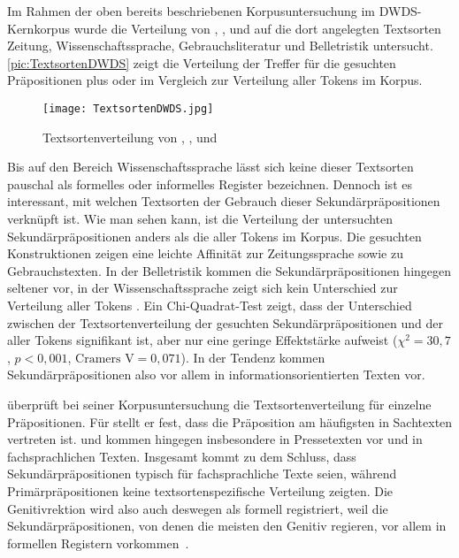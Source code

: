 Im Rahmen der oben bereits beschriebenen Korpusuntersuchung im DWDS-Kernkorpus \citep[s.][]{Vieregge.2019} wurde die Verteilung von \waehrend, \dank,  und  auf die dort angelegten Textsorten \glqq Zeitung\grqq, \glqq Wissenschaftssprache\grqq, \glqq Gebrauchsliteratur\grqq{} und \glqq Belletristik\grqq{} untersucht. 
\autoref{pic:TextsortenDWDS} zeigt die Verteilung der Treffer für die gesuchten Präpositionen plus  oder  im Vergleich zur Verteilung aller Tokens im Korpus.

\begin{figure}
\centering
\texttt{[image: TextsortenDWDS.jpg]}
\caption{Textsortenverteilung von \waehrend, \dank,  und  \citep[s.][]{Vieregge.2019}}
\label{pic:TextsortenDWDS}
\end{figure}

Bis auf den Bereich Wissenschaftssprache lässt sich keine dieser Textsorten pauschal als formelles oder informelles Register bezeichnen. 
Dennoch ist es interessant, mit welchen Textsorten der Gebrauch dieser Sekundärpräpositionen verknüpft ist. 
Wie man sehen kann, ist die Verteilung der untersuchten Sekundärpräpositionen anders als die aller Tokens im Korpus. 
Die gesuchten Konstruktionen zeigen eine leichte Affinität zur Zeitungssprache sowie zu Gebrauchstexten. 
In der Belletristik kommen die Sekundärpräpositionen hingegen seltener vor, in der Wissenschaftssprache zeigt sich kein Unterschied zur Verteilung aller Tokens \citep[s.][]{Vieregge.2019}. 
Ein Chi-Quadrat-Test zeigt, dass der Unterschied zwischen der Textsortenverteilung der gesuchten Sekundärpräpositionen und der aller Tokens signifikant ist, aber nur eine geringe Effektstärke aufweist ($\chi^2=30{,}7$, $p<0{,}001$, $\text{Cramers V}=0{,}071$).
In der Tendenz kommen Sekundärpräpositionen also vor allem in informationsorientierten Texten vor.

\citet[176--184]{DiMeola2000} überprüft bei seiner Korpusuntersuchung die Textsortenverteilung für einzelne Präpositionen. 
Für \waehrend{} stellt er fest, dass die Präposition am häufigsten in Sachtexten vertreten ist.
 und \dank{} kommen hingegen insbesondere in Pressetexten vor und \gegenueber{} in fachsprachlichen Texten. 
Insgesamt kommt \citet[184]{DiMeola2000} zu dem Schluss, dass Sekundärpräpositionen typisch für fachsprachliche Texte seien, während Primärpräpositionen keine textsortenspezifische Verteilung zeigten. 
Die Genitivrektion wird also auch deswegen als formell registriert, weil die Sekund{\"a}rpr{\"a}positionen, von denen die meisten den Genitiv regieren, vor allem in formellen Registern vorkommen~\citep[s.][209]{Becker2011}. 

